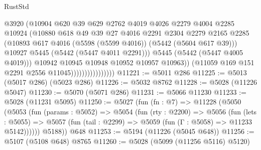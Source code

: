 \begin{lexlean}{RustStd}
\begin{coremodule}
{\begin{coremodule}
{{{{{{{{{{{{                                      @3920
                                      (@10904
                                        @620
                                        @39
                                        @629
                                        @2762
                                        @4019
                                        @4026
                                        @2279
                                        @4004
                                        @2285
                                        @10924
                                        (@10880
                                          @618
                                          @49
                                          @39
                                          @27
                                          @4016
                                          @2291
                                          @2304
                                          @2279
                                          @2165
                                          @2285
                                          (@10893
                                            @617
                                            @4016
                                            (@5598 (@5599 @4016))
                                            (@5442 (@5604 @617 @39)))
                                          @10927
                                          @5445
                                          (@5442 (@5447 @4011 @2291)))
                                        @5445
                                        (@5442 (@5447 @4005 @4019)))
                                      @10942
                                      @10945
                                      @10948
                                      @10952
                                      @10957
                                      @10963))
                                  (@11059 @169 @151 @2291 @2556 @11045))))))))))))))))
@11221 := @5011 @286
@11225 := @5013 (@5017 @286) (@5023 @286)
@11226 := @5032 @8762
@11228 := @5028 (@11226 @5047)
@11230 := @5070 (@5071 @286)
@11231 := @5066 @11230
@11233 := @5028 (@11231 @5095)
@11250 := @5027
    (fun (fn : @7) =>
    @11228
      (@5050
        (@5053
          (fun (params : @5052) =>
          @5054
            (fun (rty : @2200) =>
            @5056
              (fun (lets : @5055) =>
              @5057 (fun (tail : @2299) => @5059 (fun (Γ : @5058) => @11233 @5142))))))
        @5188))
    @648
@11253 := @5194 (@11226 (@5045 @648))
@11256 := @5107 (@5108 @648) @8765
@11260 := @5028 (@5099 (@11256 @5116) @5120)
}}}}}}}}}}}}
\end{coremodule}}
\end{coremodule}
\end{lexlean}
